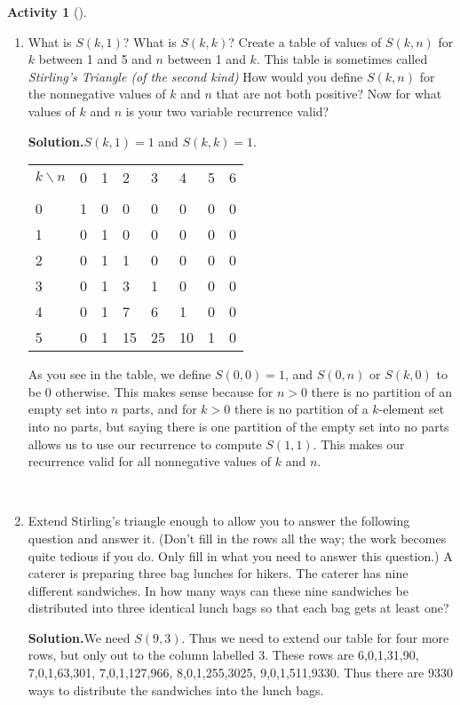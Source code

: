 \documentclass[10pt,]{book}
\theoremstyle{plain}
\theoremstyle{definition}
\newtheorem{activity}[project]{Activity}
\numberwithin{equation}{chapter}
\newcommand{\hrulethin}  {\noalign{\hrule height 0.04em}}
\begin{document}
\begin{activity}[]
\begin{enumerate}[label=(\alph*)]
~\par
\item What is \(S(k,1)\)? What is \(S(k,k)\)? Create a table of values of \(S(k,n)\) for \(k\) between 1 and 5 and \(n\) between 1 and \(k\). This table is sometimes called \emph{Stirling's Triangle (of the second kind)} How would you define \(S(k,n)\) for the nonnegative values of \(k\) and \(n\) that are not both positive? Now for what values of \(k\) and \(n\) is your two variable recurrence valid?%
\par\medskip\noindent%
\textbf{Solution.}\quad \(S(k,1)=1\) and \(S(k,k)=1\).%
\begin{tabular}{llllllll}
\(k\backslash n\)&0&1&2&3&4&5&6\tabularnewline[0pt]
&&&&&&&\tabularnewline\hrulethin
0&1&0&0&0&0&0&0\tabularnewline[0pt]
1&0&1&0&0&0&0&0\tabularnewline[0pt]
2&0&1&1&0&0&0&0\tabularnewline[0pt]
3&0&1&3&1&0&0&0\tabularnewline[0pt]
4&0&1&7&6&1&0&0\tabularnewline[0pt]
5&0&1&15&25&10&1&0
\end{tabular}
As you see in the table, we define \(S(0,0)=1\), and \(S(0,n)\) or \(S(k,0)\) to be 0 otherwise. This makes sense because for \(n>0\) there is no partition of an empty set into \(n\) parts, and for \(k>0\) there is no partition of a \(k\)-element set into no parts, but saying there is one partition of the empty set into no parts allows us to use our recurrence to compute \(S(1,1)\). This makes our recurrence valid for all nonnegative values of \(k\) and \(n\).%

~\par
\item Extend Stirling's triangle enough to allow you to answer the following question and answer it. (Don't fill in the rows all the way; the work becomes quite tedious if you do. Only fill in what you need to answer this question.) A caterer is preparing three bag lunches for hikers. The caterer has nine different sandwiches. In how many ways can these nine sandwiches be distributed into three identical lunch bags so that each bag gets at least one?%
\par\medskip\noindent%
\textbf{Solution.}\quad We need \(S(9,3)\). Thus we need to extend our table for four more rows, but only out to the column labelled 3. These rows are 6,0,1,31,90, 7,0,1,63,301, 7,0,1,127,966, 8,0,1,255,3025, 9,0,1,511,9330. Thus there are 9330 ways to distribute the sandwiches into the lunch bags.%


\end{enumerate}
\end{activity}
\end{document}
